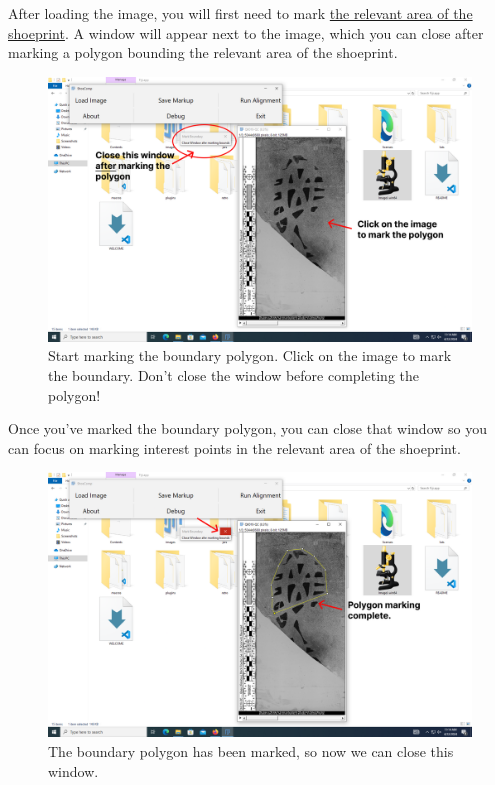 \documentclass{csafedoc}
\begin{document}
After loading the image, you will first need to mark \underline{the relevant area of the
	shoeprint}. A window will appear next to the image, which you can close after marking a
polygon bounding the relevant area of the shoeprint.

\begin{figure}[H]
	\begin{center}
		\includegraphics[width=0.8\linewidth]{images/step_4b-anno.png}
	\end{center}
	\caption{Start marking the boundary polygon. Click on the image to mark the boundary.
		Don't close the window before completing the polygon!}
	\label{fig:step4b}
\end{figure}

Once you've marked the boundary polygon, you can close that window so you can focus on
marking interest points in the relevant area of the shoeprint.

\begin{figure}[H]
	\begin{center}
		\includegraphics[width=0.8\linewidth]{images/step_4c-anno.png}
	\end{center}
	\caption{The boundary polygon has been marked, so now we can close this window.}
	\label{fig:step4c}
\end{figure}
\end{document}
